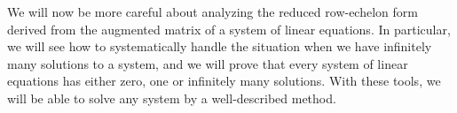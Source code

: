 %
\begin{introduction}
\begin{para}We will now be more careful about analyzing the reduced row-echelon form derived from the  augmented matrix of a system of linear equations.    In particular, we will see how to systematically handle the situation when we have infinitely many solutions to a system, and we will prove that every system of linear equations has either zero, one or infinitely many solutions.  With these tools, we will be able to solve any system by a well-described method.\end{para}
\end{introduction}
%
